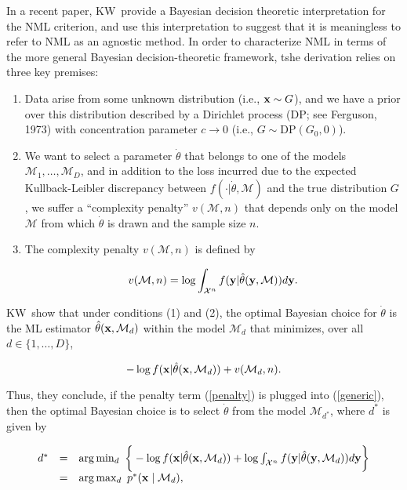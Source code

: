 \documentclass[authoryear]{elsarticle}
\newcommand{\condon}{|}
\newcommand{\model}{\mathcal{M}}
\newcommand{\sspace}[2]{\mathcal{#1}^{#2}}
\newcommand{\kw}{KW}
\newcommand{\vx}{\ensuremath{{\bf x}}}
\newcommand{\vy}{\ensuremath{{\bf y}}}
\begin{document}
In a recent paper, \kw \ provide a Bayesian decision theoretic
interpretation for the NML criterion, and use this interpretation to suggest
that it is meaningless to refer to NML as an agnostic method.
In order to characterize NML in terms of the more general Bayesian
decision-theoretic framework, tshe derivation relies on three key premises:
\begin{enumerate}
\item Data arise from some unknown distribution (i.e., $\vx \sim G$),
  and we have a prior over this distribution described by a Dirichlet
  process (DP; see Ferguson, 1973) with concentration parameter
  $c \rightarrow 0$ (i.e., $G \sim \mbox{DP}(G_0,0)$).
\item We want to select a parameter $\dot{\theta}$ that belongs to
  one of the models $\model_1, \ldots, \model_D$, and in addition to
  the loss incurred due to the expected Kullback-Leibler discrepancy
  between $f(\cdot \condon \dot{\theta},\model)$ and the true distribution
  $G$, we suffer a ``complexity penalty'' $v(\model,n)$ that depends only on the
  model $\model$ from which $\dot{\theta}$ is drawn and the sample size
  $n$.
\item The complexity penalty $v(\model,n)$
  is defined by

\begin{equation} \label{penalty}
v(\model,n) =   \log \int_{\sspace{X}{n}} f(\vy \condon \hat{\theta}(\vy,\model)) d\vy.
\end{equation}

\end{enumerate}
\kw\ show that under conditions (1) and (2), the optimal Bayesian choice for
$\dot{\theta}$ is the ML estimator $\hat{\theta}(\vx,\model_d)$ within
the model $\model_d$ that minimizes, over all $d \in \{1, \ldots, D\}$,

\vspace*{-12pt}
\begin{equation}
\label{generic}
- \log f(\vx \condon \hat{\theta}(\vx,\model_d)) + v(\model_d,n).
\end{equation}

Thus, they conclude, if the penalty term (\ref{penalty}) is plugged
into (\ref{generic}), then the optimal Bayesian choice is to select
$\dot{\theta}$ from the model $\model_{d^*}$, where $d^*$ is given by

\vspace*{-12pt}
\begin{equation}
\label{eq:banana}
\begin{array}{rcl}
d^* &=& \arg \min_d \ \bigg\{ - \log f(\vx \condon \hat{\theta}(\vx,\model_d)) + \log
\int_{\sspace{X}{n}} f(\vy \condon \hat{\theta}(\vy,\model_d)) d\vy
\bigg\} \\
&=& \arg \max_d \ p^*(\vx \mid \model_d), \end{array}
\end{equation}
\end{document}

